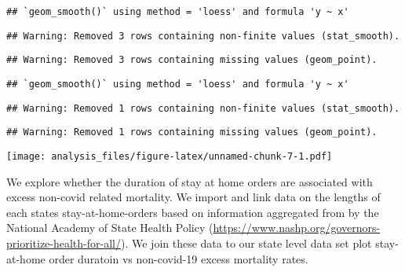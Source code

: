 \documentclass[
]{article}
\newenvironment{Shaded}{\begin{snugshade}}{\end{snugshade}}
\newcommand{\DataTypeTok}[1]{\textcolor[rgb]{0.13,0.29,0.53}{#1}}
\newcommand{\DecValTok}[1]{\textcolor[rgb]{0.00,0.00,0.81}{#1}}
\newcommand{\KeywordTok}[1]{\textcolor[rgb]{0.13,0.29,0.53}{\textbf{#1}}}
\newcommand{\NormalTok}[1]{#1}
\newcommand{\OperatorTok}[1]{\textcolor[rgb]{0.81,0.36,0.00}{\textbf{#1}}}
\newcommand{\OtherTok}[1]{\textcolor[rgb]{0.56,0.35,0.01}{#1}}
\newcommand{\StringTok}[1]{\textcolor[rgb]{0.31,0.60,0.02}{#1}}
\begin{document}
\begin{verbatim}
## `geom_smooth()` using method = 'loess' and formula 'y ~ x'
\end{verbatim}

\begin{verbatim}
## Warning: Removed 3 rows containing non-finite values (stat_smooth).
\end{verbatim}

\begin{verbatim}
## Warning: Removed 3 rows containing missing values (geom_point).
\end{verbatim}

\begin{verbatim}
## `geom_smooth()` using method = 'loess' and formula 'y ~ x'
\end{verbatim}

\begin{verbatim}
## Warning: Removed 1 rows containing non-finite values (stat_smooth).
\end{verbatim}

\begin{verbatim}
## Warning: Removed 1 rows containing missing values (geom_point).
\end{verbatim}

\texttt{[image: analysis\_files/figure-latex/unnamed-chunk-7-1.pdf]}

We explore whether the duration of stay at home orders are associated
with excess non-covid related mortality. We import and link data on the
lengths of each states stay-at-home-orders based on information
aggregated from by the National Academy of State Health Policy
(\url{https://www.nashp.org/governors-prioritize-health-for-all/}). We
join these data to our state level data set plot stay-at-home order
duratoin vs non-covid-19 excess mortality rates.

\begin{Shaded}
\end{Shaded}
\end{document}
